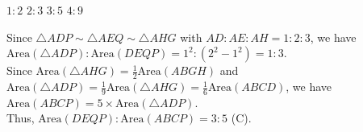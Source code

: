 \begin{minipage}{0.38\textwidth}
\begin{choices}
    \choice $1 : 2$
    \choice $2 : 3$
    \correctchoice $3 : 5$
    \choice $4 : 9$
\end{choices}
\end{minipage}
\begin{minipage}{0.58\textwidth}
\centering
{}
\end{minipage}
\begin{solution}
Since $\triangle ADP \sim \triangle AEQ \sim \triangle AHG$ with $AD : AE : AH = 1 : 2 : 3$, we have $\text{Area}(\triangle ADP) : \text{Area}(DEQP) = 1^2 : (2^2 - 1^2) = 1 : 3$. \\
Since $\text{Area}(\triangle AHG) = \frac{1}{2}\text{Area}(ABGH)$ and $\text{Area}(\triangle ADP) = \frac{1}{9}\text{Area}(\triangle AHG) = \frac{1}{6}\text{Area}(ABCD)$, we have $\text{Area}(ABCP) = 5 \times \text{Area}(\triangle ADP)$. \\
Thus, $\text{Area}(DEQP) : \text{Area}(ABCP) = 3 : 5$ (C).
\end{solution}